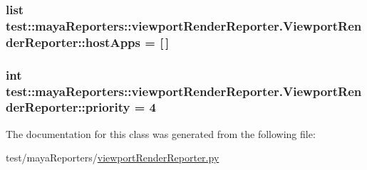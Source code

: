\hypertarget{classtest_1_1mayaReporters_1_1viewportRenderReporter_1_1ViewportRenderReporter_a7c0e7f44755d838bef3e81259eac7710}{
\subsubsection[{host\-Apps}]{\setlength{\rightskip}{0pt plus 5cm}list {\bf test\-::maya\-Reporters\-::viewport\-Render\-Reporter.\-Viewport\-Render\-Reporter\-::host\-Apps} = \mbox{[}$\,$\mbox{]}}}\label{dd/d73/classtest_1_1mayaReporters_1_1viewportRenderReporter_1_1ViewportRenderReporter_a7c0e7f44755d838bef3e81259eac7710}
\hypertarget{classtest_1_1mayaReporters_1_1viewportRenderReporter_1_1ViewportRenderReporter_a049e080fbf3fff48f430ed7e3c70878e}{
\subsubsection[{priority}]{\setlength{\rightskip}{0pt plus 5cm}int {\bf test\-::maya\-Reporters\-::viewport\-Render\-Reporter.\-Viewport\-Render\-Reporter\-::priority} = 4}}\label{dd/d73/classtest_1_1mayaReporters_1_1viewportRenderReporter_1_1ViewportRenderReporter_a049e080fbf3fff48f430ed7e3c70878e}


\-The documentation for this class was generated from the following file\-:\begin{DoxyCompactItemize}
\item 
test/maya\-Reporters/\hyperlink{viewportRenderReporter_8py}{viewport\-Render\-Reporter.\-py}\end{DoxyCompactItemize}
